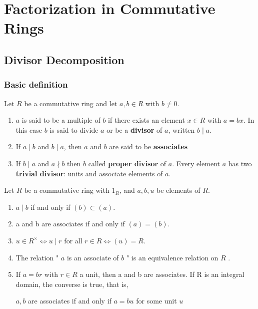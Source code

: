 \chapter{Factorization in Commutative Rings}

\section{Divisor Decomposition} %
\subsection{Basic definition} %
\begin{definition}
    Let $R$ be a commutative ring and let $a, b \in R$ with $b \neq 0$.

    \begin{enumerate}
        \item
              $a$ is said to be a multiple of $b$ if there exists an element $x \in R$ with $a=b x$. In this case $b$ is said to divide $a$ or be a \textbf{divisor} of $a$, written $b \mid a$.

        \item
              If $a\mid b$ and $b\mid a$, then $a$ and $b$ are said to be \textbf{associates}

        \item
              If $b \mid a$ and $a\nmid b$ then $b$ called \textbf{proper divisor} of $a$. Every element $a$ has two \textbf{trivial divisor}: units and associate elements of $a$.
    \end{enumerate}
\end{definition}


\begin{theorem}
    Let $R$ be a commutative ring with $1_R$, and $a, b,u$ be elements of $R$.

    \begin{enumerate}
        \item ${a} \mid {b}$ if and only if $({b}) \subset({a})$.

        \item a and b are associates if and only if $({a})=({b})$.

        \item $u\in R^\times \Leftrightarrow u\mid r \text{ for all } r \in R \Leftrightarrow \left(u\right) =R$.

        \item The relation " $a$ is an associate of $b$ " is an equivalence relation on $R$ .

        \item If ${a}={br}$ with ${r} \in {R}$ a unit, then a and b are associates. If R is an integral domain, the converse is true, that is,
              \begin{center}
                  $a,b$ are associates if and only if $a=bu$ for some unit $u$
              \end{center}
    \end{enumerate}
\end{theorem}


